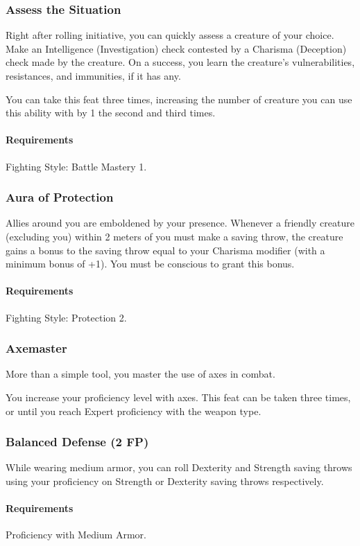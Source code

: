 \subsubsection{Assess the Situation} \label{feat::assessthesituation}
    Right after rolling initiative, you can quickly assess a creature of your choice.
    Make an Intelligence (Investigation) check contested by a Charisma (Deception) check made by the creature.
    On a success, you learn the creature's vulnerabilities, resistances, and immunities, if it has any.

    You can take this feat three times, increasing the number of creature you can use this ability with by 1 the second and third times.
    \paragraph{Requirements} Fighting Style: Battle Mastery 1.
\subsubsection{Aura of Protection} \label{feat::auraofprotection}
    Allies around you are emboldened by your presence.
    Whenever a friendly creature (excluding you) within 2 meters of you must make a saving throw, the creature gains a bonus to the saving throw equal to your Charisma modifier (with a minimum bonus of +1).
    You must be conscious to grant this bonus.
    \paragraph{Requirements} Fighting Style: Protection 2.
\subsubsection{Axemaster} \label{feat::axemaster}
    More than a simple tool, you master the use of axes in combat.

    You increase your proficiency level with axes.
    This feat can be taken three times, or until you reach Expert proficiency with the weapon type.
\subsubsection{Balanced Defense (2 FP)} \label{feat::balanceddefense}
    While wearing medium armor, you can roll Dexterity and Strength saving throws using your proficiency on Strength or Dexterity saving throws respectively.
    \paragraph{Requirements} Proficiency with Medium Armor.
